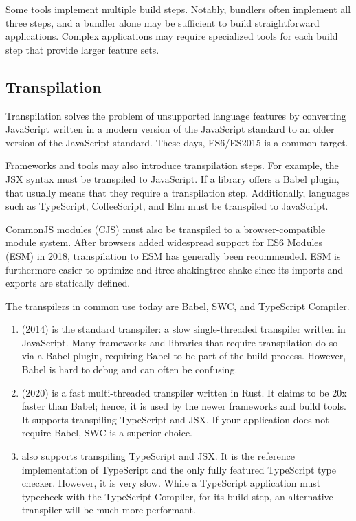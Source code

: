 \documentclass{article}
\begin{document}
Some tools implement multiple build steps. Notably, bundlers often implement all three steps, and a
bundler alone may be sufficient to build straightforward applications. Complex applications may
require specialized tools for each build step that provide larger feature sets.

\subsection{Transpilation}

Transpilation solves the problem of unsupported language features by converting JavaScript written
in a modern version of the JavaScript standard to an older version of the JavaScript standard. These
days, ES6/ES2015 is a common target.

Frameworks and tools may also introduce transpilation steps. For example, the JSX syntax must be
transpiled to JavaScript. If a library offers a Babel plugin, that usually means that they require a
transpilation step. Additionally, languages such as TypeScript, CoffeeScript, and Elm must be
transpiled to JavaScript.

\href{https://wiki.commonjs.org/wiki/Modules}{CommonJS modules} (CJS) must also be transpiled to a
browser-compatible module system. After browsers added widespread support for
\href{https://exploringjs.com/es6/ch_modules.html}{ES6 Modules} (ESM) in 2018, transpilation to ESM
has generally been recommended. ESM is furthermore easier to optimize and
\l{tree-shaking}{tree-shake} since its imports and exports are statically defined.

The transpilers in common use today are Babel, SWC, and TypeScript Compiler.

\begin{enumerate}
  \item \href{https://babeljs.io/}{} (2014) is the standard transpiler: a slow
    single-threaded transpiler written in JavaScript. Many frameworks and libraries that require
    transpilation do so via a Babel plugin, requiring Babel to be part of the build process.
    However, Babel is hard to debug and can often be confusing.

  \item \href{https://swc.rs/}{} (2020) is a fast multi-threaded transpiler written in Rust.
    It claims to be 20x faster than Babel; hence, it is used by the newer frameworks and build
    tools. It supports transpiling TypeScript and JSX. If your application does not require Babel,
    SWC is a superior choice.

  \item \href{https://github.com/microsoft/TypeScript}{} also supports
    transpiling TypeScript and JSX. It is the reference implementation of TypeScript and the only
    fully featured TypeScript type checker. However, it is very slow. While a TypeScript application
    must typecheck with the TypeScript Compiler, for its build step, an alternative transpiler will
    be much more performant.
\end{enumerate}
\end{document}
